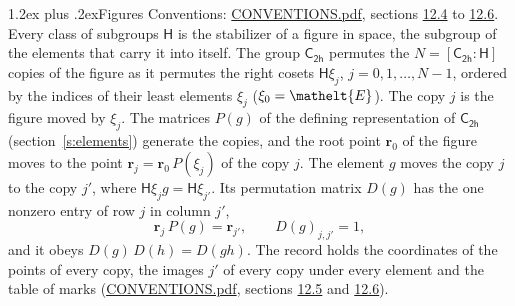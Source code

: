 \documentclass[10pt,a4paper]{article}
\makeatletter
\renewcommand\section{\@startsection{section}{1}{\z@}{-3ex plus -1ex minus -.2ex}%
  {1.2ex plus .2ex}{\normalfont\large\sffamily\bfseries\color{parttitle}}}
\numberwithin{equation}{section}
\newcommand{\eltfont}[1]{{\let\sigma\eltsigma\mathelt{#1}}}
\newcommand{\grp}[1]{\mathsf{#1}}
\newcommand{\cls}[1]{\eltfont{#1}}
\newcommand{\pointr}{\mathbf{r}}
\makeatother
\begin{document}
\section{Figures}\label{s:permutation}
Conventions: \href{../../CONVENTIONS.pdf}{CONVENTIONS.pdf}, sections \href{../../CONVENTIONS.pdf\#conv.12.4}{12.4} to \href{../../CONVENTIONS.pdf\#conv.12.6}{12.6}.
Every class of subgroups $\grp{H}$ is the stabilizer of a figure in space, the subgroup of the elements that carry it into itself. \label{n:local.orbit.size}\label{n:element.coset.least}\label{n:index.coset}The group $\grp{C_{2h}}$ permutes the $N = [\grp{C_{2h}} : \grp{H}]$ copies of the figure as it permutes the right cosets $\grp{H}\xi_j$, $j = 0, 1, \dots, N - 1$, ordered by the indices of their least elements $\xi_j$ ($\xi_0 = \cls{E}$). The copy $j$ is the figure moved by $\xi_j$. The matrices $P(g)$ of the defining representation of $\grp{C_{2h}}$ (section~\ref{s:elements}) generate the copies, and the root point $\pointr_0$ of the figure moves to the point $\pointr_j = \pointr_0\, P(\xi_j)$ of the copy $j$. \label{n:local.coset.image}The element $g$ moves the copy $j$ to the copy $j'$, where $\grp{H}\xi_j g = \grp{H}\xi_{j'}$. \label{n:local.matrix.permutation}Its permutation matrix $D(g)$ has the one nonzero entry of row $j$ in column $j'$,
\begin{equation}\label{e:perm.matrix}\pointr_j\, P(g) = \pointr_{j'}, \qquad D(g)_{j,j'} = 1,\end{equation}
and it obeys $D(g)\, D(h) = D(gh)$. The record holds the coordinates of the points of every copy, the images $j'$ of every copy under every element and the table of marks (\href{../../CONVENTIONS.pdf}{CONVENTIONS.pdf}, sections \href{../../CONVENTIONS.pdf\#conv.12.5}{12.5} and \href{../../CONVENTIONS.pdf\#conv.12.6}{12.6}).
\end{document}

